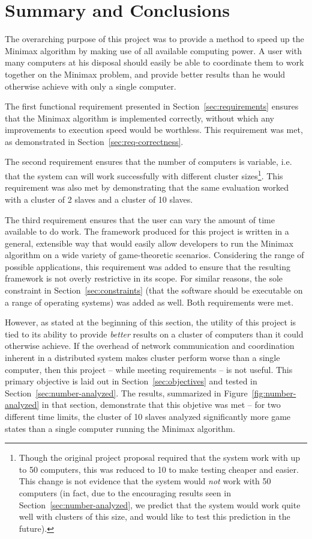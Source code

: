 \documentclass[pdftex,12pt,a4paper]{article}
\begin{document}
%
%
\section{Summary and Conclusions}

The overarching purpose of this project was to provide a method to speed up the Minimax algorithm by making use of all available computing power. A user with many computers at his disposal should easily be able to coordinate them to work together on the Minimax problem, and provide better results than he would otherwise achieve with only a single computer.

The first functional requirement presented in Section~\ref{sec:requirements} ensures that the Minimax algorithm is implemented correctly, without which any improvements to execution speed would be worthless. This requirement was met, as demonstrated in Section~\ref{sec:req-correctness}.

The second requirement ensures that the number of computers is variable, i.e. that the system can will work successfully with different cluster sizes\footnote{Though the original project proposal required that the system work with up to 50 computers, this was reduced to 10 to make testing cheaper and easier. This change is not evidence that the system would \emph{not} work with 50 computers (in fact, due to the encouraging results seen in Section~\ref{sec:number-analyzed}, we predict that the system would work quite well with clusters of this size, and would like to test this prediction in the future).}. This requirement was also met by demonstrating that the same evaluation worked with a cluster of 2 slaves and a cluster of 10 slaves.

The third requirement ensures that the user can vary the amount of time available to do work. The framework produced for this project is written in a general, extensible way that would easily allow developers to run the Minimax algorithm on a wide variety of game-theoretic scenarios. Considering the range of possible applications, this requirement was added to ensure that the resulting framework is not overly restrictive in its scope. For similar reasons, the sole constraint in Section~\ref{sec:constraints} (that the software should be executable on a range of operating systems) was added as well. Both requirements were met.

However, as stated at the beginning of this section, the utility of this project is tied to its ability to provide \emph{better} results on a cluster of computers than it could otherwise achieve. If the overhead of network communication and coordination inherent in a distributed system makes cluster perform worse than a single computer, then this project -- while meeting requirements -- is not useful. This primary objective is laid out in Section~\ref{sec:objectives} and tested in Section~\ref{sec:number-analyzed}. The results, summarized in Figure~\ref{fig:number-analyzed} in that section, demonstrate that this objetive was met -- for two different time limits, the cluster of 10 slaves analyzed significantly more game states than a single computer running the Minimax algorithm.
\end{document}
